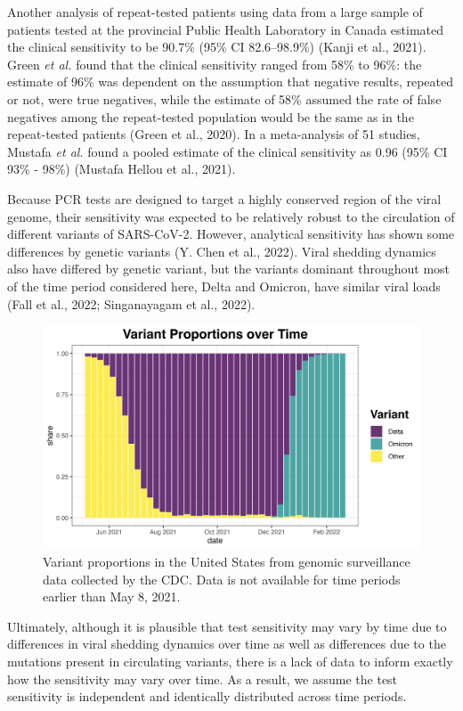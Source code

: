\documentclass[12pt,twoside]{smiththesis}
\begin{document}
Another analysis of repeat-tested patients using data from a large sample of patients tested at the provincial Public Health Laboratory in Canada estimated the clinical sensitivity to be 90.7\% (95\% CI 82.6--98.9\%) (Kanji et al., 2021). Green \emph{et al.} found that the clinical sensitivity ranged from 58\% to 96\%: the estimate of 96\% was dependent on the assumption that negative results, repeated or not, were true negatives, while the estimate of 58\% assumed the rate of false negatives among the repeat-tested population would be the same as in the repeat-tested patients (Green et al., 2020). In a meta-analysis of 51 studies, Mustafa \emph{et al.} found a pooled estimate of the clinical sensitivity as 0.96 (95\% CI 93\% - 98\%) (Mustafa Hellou et al., 2021).

Because PCR tests are designed to target a highly conserved region of the viral genome, their sensitivity was expected to be relatively robust to the circulation of different variants of SARS-CoV-2. However, analytical sensitivity has shown some differences by genetic variants (Y. Chen et al., 2022). Viral shedding dynamics also have differed by genetic variant, but the variants dominant throughout most of the time period considered here, Delta and Omicron, have similar viral loads (Fall et al., 2022; Singanayagam et al., 2022).
\begin{figure}

{\centering \includegraphics[width=0.8\linewidth]{./figure/variant_plot} 

}

\caption{Variant proportions in the United States from genomic surveillance data collected by the CDC. Data is not available for time periods earlier than May 8, 2021.}\label{fig:unnamed-chunk-58}
\end{figure}
Ultimately, although it is plausible that test sensitivity may vary by time due to differences in viral shedding dynamics over time as well as differences due to the mutations present in circulating variants, there is a lack of data to inform exactly how the sensitivity may vary over time. As a result, we assume the test sensitivity is independent and identically distributed across time periods.
\end{document}
